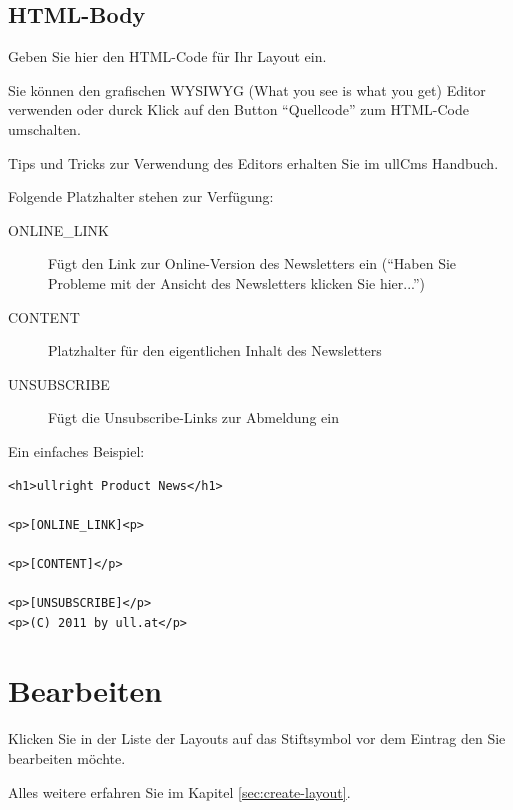 \documentclass[article, a4paper, oneside, 11pt]{memoir}
\begin{document}
\subsection{HTML-Body}

Geben Sie hier den HTML-Code für Ihr Layout ein.

Sie können den grafischen WYSIWYG (What you see is what you get) Editor verwenden oder durck Klick auf den Button "`Quellcode"' zum HTML-Code umschalten.

Tips und Tricks zur Verwendung des Editors erhalten Sie im ullCms Handbuch.


Folgende Platzhalter stehen zur Verfügung:

\begin{description}
 \item[\lbrack ONLINE\_LINK\rbrack] Fügt den Link zur Online-Version des Newsletters ein ("`Haben Sie Probleme mit der Ansicht des Newsletters klicken Sie hier..."')
 \item[\lbrack CONTENT\rbrack] Platzhalter für den eigentlichen Inhalt des Newsletters
 \item[\lbrack UNSUBSCRIBE\rbrack] Fügt die Unsubscribe-Links zur Abmeldung ein
\end{description}


Ein einfaches Beispiel:

\begin{lstlisting}
<h1>ullright Product News</h1>

<p>[ONLINE_LINK]<p>

<p>[CONTENT]</p>

<p>[UNSUBSCRIBE]</p>
<p>(C) 2011 by ull.at</p>
\end{lstlisting}

\section{Bearbeiten}

Klicken Sie in der Liste der Layouts auf das Stiftsymbol vor dem Eintrag den Sie bearbeiten möchte.

Alles weitere erfahren Sie im Kapitel \vref{sec:create-layout}.
\end{document}
